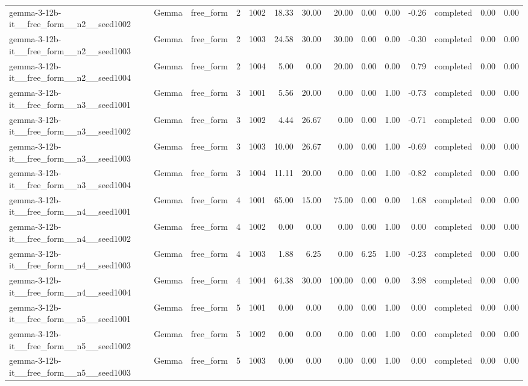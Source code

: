 \begin{longtable}{lllrrrrrrrrlrr}
gemma-3-12b-it\_\_free\_form\_\_n2\_\_seed1002 & Gemma & free\_form & 2 & 1002 & 18.33 & 30.00 & 20.00 & 0.00 & 0.00 & -0.26 & completed & 0.00 & 0.00 \\
gemma-3-12b-it\_\_free\_form\_\_n2\_\_seed1003 & Gemma & free\_form & 2 & 1003 & 24.58 & 30.00 & 30.00 & 0.00 & 0.00 & -0.30 & completed & 0.00 & 0.00 \\
gemma-3-12b-it\_\_free\_form\_\_n2\_\_seed1004 & Gemma & free\_form & 2 & 1004 & 5.00 & 0.00 & 20.00 & 0.00 & 0.00 & 0.79 & completed & 0.00 & 0.00 \\
gemma-3-12b-it\_\_free\_form\_\_n3\_\_seed1001 & Gemma & free\_form & 3 & 1001 & 5.56 & 20.00 & 0.00 & 0.00 & 1.00 & -0.73 & completed & 0.00 & 0.00 \\
gemma-3-12b-it\_\_free\_form\_\_n3\_\_seed1002 & Gemma & free\_form & 3 & 1002 & 4.44 & 26.67 & 0.00 & 0.00 & 1.00 & -0.71 & completed & 0.00 & 0.00 \\
gemma-3-12b-it\_\_free\_form\_\_n3\_\_seed1003 & Gemma & free\_form & 3 & 1003 & 10.00 & 26.67 & 0.00 & 0.00 & 1.00 & -0.69 & completed & 0.00 & 0.00 \\
gemma-3-12b-it\_\_free\_form\_\_n3\_\_seed1004 & Gemma & free\_form & 3 & 1004 & 11.11 & 20.00 & 0.00 & 0.00 & 1.00 & -0.82 & completed & 0.00 & 0.00 \\
gemma-3-12b-it\_\_free\_form\_\_n4\_\_seed1001 & Gemma & free\_form & 4 & 1001 & 65.00 & 15.00 & 75.00 & 0.00 & 0.00 & 1.68 & completed & 0.00 & 0.00 \\
gemma-3-12b-it\_\_free\_form\_\_n4\_\_seed1002 & Gemma & free\_form & 4 & 1002 & 0.00 & 0.00 & 0.00 & 0.00 & 1.00 & 0.00 & completed & 0.00 & 0.00 \\
gemma-3-12b-it\_\_free\_form\_\_n4\_\_seed1003 & Gemma & free\_form & 4 & 1003 & 1.88 & 6.25 & 0.00 & 6.25 & 1.00 & -0.23 & completed & 0.00 & 0.00 \\
gemma-3-12b-it\_\_free\_form\_\_n4\_\_seed1004 & Gemma & free\_form & 4 & 1004 & 64.38 & 30.00 & 100.00 & 0.00 & 0.00 & 3.98 & completed & 0.00 & 0.00 \\
gemma-3-12b-it\_\_free\_form\_\_n5\_\_seed1001 & Gemma & free\_form & 5 & 1001 & 0.00 & 0.00 & 0.00 & 0.00 & 1.00 & 0.00 & completed & 0.00 & 0.00 \\
gemma-3-12b-it\_\_free\_form\_\_n5\_\_seed1002 & Gemma & free\_form & 5 & 1002 & 0.00 & 0.00 & 0.00 & 0.00 & 1.00 & 0.00 & completed & 0.00 & 0.00 \\
gemma-3-12b-it\_\_free\_form\_\_n5\_\_seed1003 & Gemma & free\_form & 5 & 1003 & 0.00 & 0.00 & 0.00 & 0.00 & 1.00 & 0.00 & completed & 0.00 & 0.00 \\

\end{longtable}
